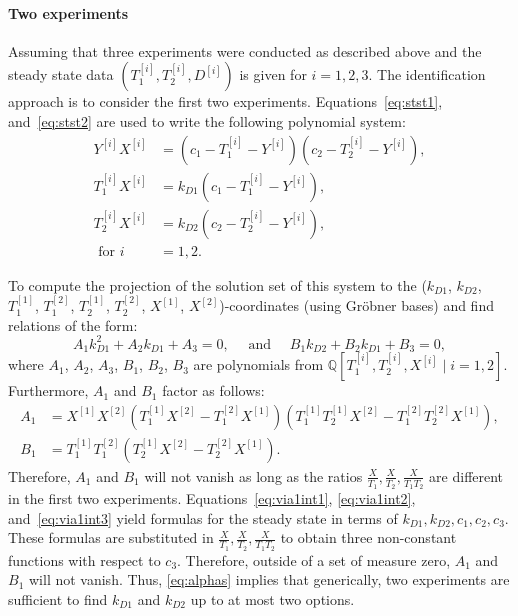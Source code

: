 \paragraph{Two experiments}
Assuming that three experiments were conducted as described above and the steady state data $(T_1^{[i]}, T_2^{[i]}, D^{[i]})$ is given for $i = 1, 2, 3$.
The identification approach is to consider the first two experiments.
Equations~\eqref{eq:stst1}, and~\eqref{eq:stst2} are used to write the following polynomial system:
\begin{subequations}
	\begin{align}
		Y^{[i]} X^{[i]} &= (c_1 - T_1^{[i]} - Y^{[i]}) (c_2 - T_2^{[i]} - Y^{[i]}), \\ 
		T_1^{[i]} X^{[i]} &= k_{D1} (c_1 - T_1^{[i]} - Y^{[i]}), \\ T_2^{[i]} X^{[i]} &= k_{D2} (c_2 - T_2^{[i]} - Y^{[i]}),\\ \text{ for }i &= 1, 2.
	\end{align}
\end{subequations}

To compute the projection of the solution set of this system to the ($k_{D1}$, $k_{D2}$, $T_1^{[1]}$, $T_1^{[2]}$, $T_2^{[1]}$, $T_2^{[2]}$, $X^{[1]}$, $X^{[2]}$)-coordinates (using Gr\"obner bases) and find relations of the form:
\begin{equation}\label{eq:alphas}
	A_1 k_{D1}^2 + A_2 k_{D1} + A_3 = 0,\quad \text{ and }\quad B_1 k_{D2} + B_2 k_{D1} + B_3 = 0,
\end{equation}
where $A_1$, $A_2$, $A_3$, $B_1$, $B_2$, $B_3$ are polynomials from $\mathbb{Q}[T_1^{[i]}, T_2^{[i]}, X^{[i]} \mid i = 1, 2]$.
Furthermore, $A_1$ and $B_1$ factor as follows:
\begin{subequations}
	\begin{align}
		A_1 &= X^{[1]} X^{[2]} (T_1^{[1]} X^{[2]} - T_1^{[2]} X^{[1]}) (T_1^{[1]} T_2^{[1]} X^{[2]} - T_1^{[2]} T_2^{[2]} X^{[1]}), \\ 
		B_1 &= T_1^{[1]} T_1^{[2]} (T_2^{[1]} X^{[2]} - T_2^{[2]} X^{[1]}).
	\end{align}
\end{subequations}
Therefore, $A_1$ and $B_1$ will not vanish as long as the ratios $\frac{X}{T_1}, \frac{X}{T_2}, \frac{X}{T_1 T_2}$ are different in the first two experiments.
Equations~\eqref{eq:via1int1}, \eqref{eq:via1int2}, and~\eqref{eq:via1int3} yield formulas for the steady state in terms of $k_{D1}, k_{D2}, c_1, c_2, c_3$.
These formulas are substituted in $\frac{X}{T_1}, \frac{X}{T_2}, \frac{X}{T_1 T_2}$ to obtain three non-constant functions with respect to $c_3$. Therefore, outside of a set of measure zero, $A_1$ and $B_1$ will not vanish. Thus, \eqref{eq:alphas} implies that generically, two experiments are sufficient to find $k_{D1}$ and $k_{D2}$ up to at most two options.

